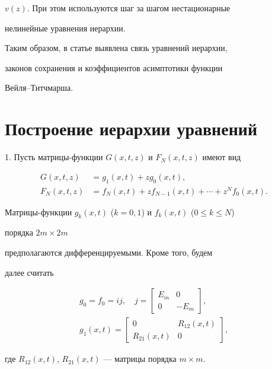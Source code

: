 $v(z)$. При этом используются шаг за шагом нестационарные  


нелинейные уравнения иерархии. 


 


Таким образом, в статье выявлена связь уравнений иерархии, 


законов сохранения и коэффициентов асимптотики функции 


Вейля--Титчмарша. 


 


\section{Построение иерархии уравнений} 


 


1. Пусть матрицы-функции $G(x,t,z)$ и $F_N(x,t,z)$ имеют вид 


\begin{align} 


G(x,t,z)&=g_1(x,t)+z g_0(x,t),\\ 


F_N(x,t,z)&=f_N(x,t)+z f_{N-1}(x,t)+\dotsb+z^N f_0(x,t). 


\end{align} 


Матрицы-функции $g_k(x,t)$ ($k=0,1$) и $f_k(x,t)$ ($0\le k\le N$) 


порядка $2m\times 2m$ 


предполагаются дифференцируемыми. Кроме того, будем 


далее считать 


\begin{gather} 


g_0=f_0=ij,\quad 


j=\begin{bmatrix} E_m & 0 \\ 0 & -E_m \end{bmatrix}, \\ 


g_1(x,t)=\begin{bmatrix} 0 & R_{12}(x,t) \\ R_{21}(x,t) & 0 


\end{bmatrix}, 


\end{gather} 


где $R_{12}(x,t)$, $R_{21}(x,t)$ --- матрицы порядка $m\times m$. 


